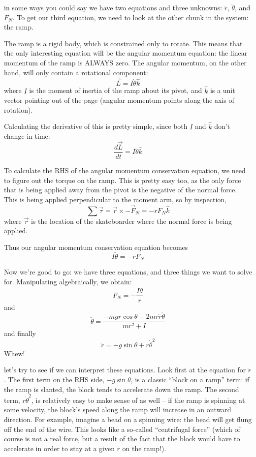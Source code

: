 \documentclass{tufte-handout}
\begin{document}
 in some ways you could say we have two equations and three unknowns: $\ddot{r}$, $\ddot{\theta}$, and $F_N$.  To get our third equation, we need to look at the other chunk in the system: the ramp.

The ramp is a rigid body, which is constrained only to rotate.  This means that the only interesting equation will be the angular momentum equation: the linear momentum of the ramp is ALWAYS zero.  The angular momentum, on the other hand, will only contain a rotational component:
$$\vec{L} = I \dot{\theta} \hat{k}$$
where $I$ is the moment of inertia of the ramp about its pivot, and $\hat{k}$ is a unit vector pointing out of the page (angular momentum points along the axis of rotation).  

Calculating the derivative of this is pretty simple, since both $I$ and $\hat{k}$ don't change in time:  
$$\frac{d\vec{L}}{dt} = I \ddot{\theta} \hat{k}$$

To calculate the RHS of the angular momentum conservation equation, we need to figure out the torque on the ramp.  This is pretty easy too, as the only force that is being applied away from the pivot is the negative of the normal force.  This is being applied perpendicular to the moment arm, so by inspection,
$$\sum \vec{\tau} = \vec{r} \times -\vec{F}_N = -rF_N\hat{k}$$
where $\vec{r}$ is the location of the skateboarder where the normal force is being applied.

Thus our angular momentum conservation equation becomes 
$$I\ddot{\theta} = -rF_N$$

Now we're good to go:  we have three equations, and three things we want to solve for.  Manipulating algebraically, we obtain:
$$F_N = -\frac{ I \ddot{\theta}}{r}$$
and
$$\ddot{\theta} = \frac{-mgr\cos\theta - 2mr\dot{r}\dot{\theta}}{mr^2 + I}$$
and finally 
$$\ddot{r} = -g \sin \theta + r\dot{\theta}^2$$
Whew!

 let's try to see if we can interpret these equations.  Look first at the equation for $\ddot{r}$.  The first term on the RHS side, $-g \sin \theta$,  is a classic ``block on a ramp'' term:  if the ramp is slanted, the block tends to accelerate down the ramp.  The second term, $r\dot{\theta}^2$, is relatively easy to make sense of as well -- if the ramp is spinning at some velocity, the block's speed along the ramp will increase in an outward direction.  For example, imagine a bead on a spinning wire: the bead will get flung off the end of the wire.  This looks like a so-called ``centrifugal force'' (which of course is not a real force, but a result of the fact that the block would have to accelerate in order to stay at a given $r$ on the ramp!).
\end{document}
